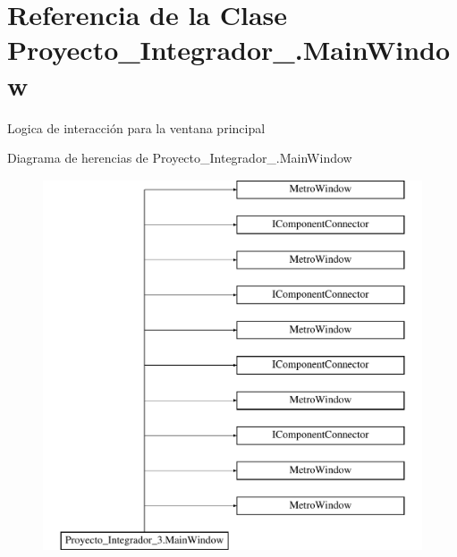 \hypertarget{class_proyecto___integrador__3_1_1_main_window}{\section{Referencia de la Clase Proyecto\-\_\-\-Integrador\-\_.\-Main\-Window}
\label{class_proyecto___integrador__3_1_1_main_window}
}


Logica de interacción para la ventana principal  


Diagrama de herencias de Proyecto\-\_\-\-Integrador\-\_.\-Main\-Window\begin{figure}[H]
\begin{center}
\leavevmode
\includegraphics[height=11.000000cm]{class_proyecto___integrador__3_1_1_main_window}
\end{center}
\end{figure}
